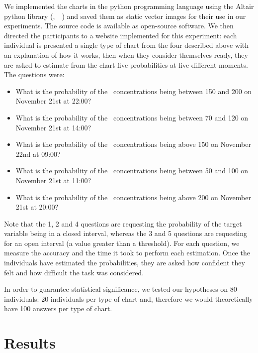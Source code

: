 \documentclass[a4paper,3p,sort&compress]{elsarticle}
\DeclareRobustCommand{\citeext}[1]{\citeauthor{#1},~\citeyear{#1}~\cite{#1}}
\begin{document}
We implemented the charts in the python programming language using the Altair
python library (\citeext{vanderplas2018altair})  
and saved them as static vector
images for their use in our experiments. The source code is available as
open-source software. 
We then directed the participants
to a website implemented for this experiment: each individual is presented a
single type of chart from the four described above with an explanation of how it
works, then when they consider themselves ready, they are asked to estimate from
the chart five probabilities at five different moments. The questions were:
\begin{itemize}
  \item What is the probability of the \no~concentrations being between 150 and 200 on November 21st at 22:00?
  \item What is the probability of the \no~concentrations being between 70 and 120 on November 21st at 14:00?
  \item What is the probability of the \no~concentrations being above 150 on November 22nd at 09:00?
  \item What is the probability of the \no~concentrations being between 50 and 100 on November 21st at 11:00?
  \item What is the probability of the \no~concentrations being above 200 on November 21st at 20:00?
\end{itemize}

Note that the 1, 2 and 4 questions are requesting the
probability of the target variable being in a closed interval, whereas the
3 and 5 questions are requesting for an open interval (a value
greater than a threshold). For each question, we measure the accuracy and the
time it took to perform each estimation. Once the individuals have estimated the
probabilities, they are asked how confident they felt and how difficult the task
was considered.

In order to guarantee statistical significance, we tested our hypotheses on 80
individuals: 20 individuals per type of chart and, therefore we would
theoretically have 100 answers per type of chart.

\section{Results}
\label{sec:results}
\end{document}
